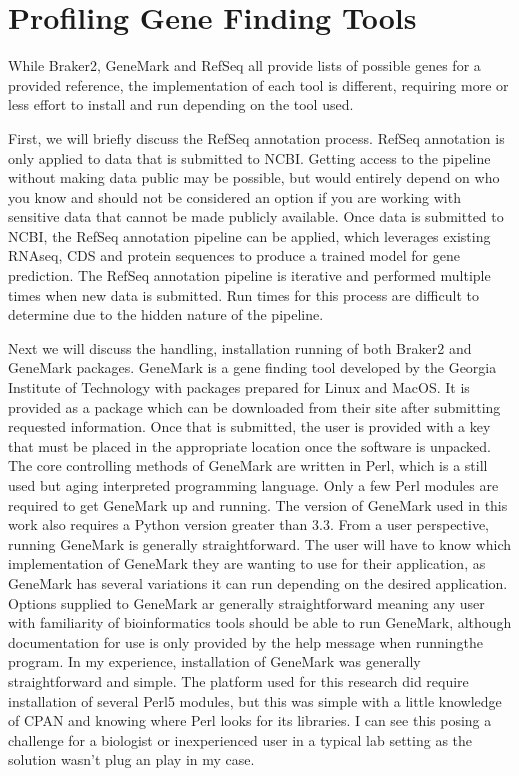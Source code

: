 \section{Profiling Gene Finding Tools}

While Braker2, GeneMark and RefSeq all provide lists of possible genes
for a provided reference, the implementation of each tool is
different, requiring more or less effort to install and run depending
on the tool used.

First, we will briefly discuss the RefSeq annotation process. RefSeq
annotation is only applied to data that is submitted to NCBI. Getting
access to the pipeline without making data public may be possible, but
would entirely depend on who you know and should not be considered an
option if you are working with sensitive data that cannot be made
publicly available. Once data is submitted to NCBI, the RefSeq
annotation pipeline can be applied, which leverages existing RNAseq,
CDS and protein sequences to produce a trained model for gene
prediction. The RefSeq annotation pipeline is iterative and performed
multiple times when new data is submitted. Run times for this process
are difficult to determine due to the hidden nature of the pipeline.

Next we will discuss the handling, installation running of both
Braker2 and GeneMark packages. GeneMark is a gene finding tool
developed by the Georgia Institute of Technology with packages
prepared for Linux and MacOS. It is provided as a package which can be
downloaded from their site after submitting requested
information. Once that is submitted, the user is provided with a key
that must be placed in the appropriate location once the software is
unpacked. The core controlling methods of GeneMark are written in
Perl, which is a still used but aging interpreted programming
language. Only a few Perl modules are required to get GeneMark up and
running. The version of GeneMark used in this work also requires a
Python version greater than 3.3. From a user perspective, running
GeneMark is generally straightforward. The user will have to know
which implementation of GeneMark they are wanting to use for their
application, as GeneMark has several variations it can run depending
on the desired application. Options supplied to GeneMark ar generally
straightforward meaning any user with familiarity of bioinformatics
tools should be able to run GeneMark, although documentation for use
is only provided by the help message when runningthe program. In my
experience, installation of GeneMark was generally straightforward and
simple. The platform used for this research did require installation
of several Perl5 modules, but this was simple with a little knowledge
of CPAN and knowing where Perl looks for its libraries. I can see this
posing a challenge for a biologist or inexperienced user in a typical
lab setting as the solution wasn't plug an play in my case.

